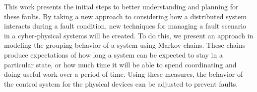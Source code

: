 This work presents the initial steps to better understanding and planning for these faults.
By taking a new approach to considering how a distributed system interacts during a fault condition,
new techniques for managing a fault scenario in a cyber-physical systems will be created. To do
this, we present an approach in modeling the grouping behavior of a system using Markov chains.
These chains produce expectations of how long a system can be expected to stay in a particular
state, or how much time it will be able to spend coordinating and doing useful work over a period
of time. Using these measures, the behavior of the control system for the physical devices
can be adjusted to prevent faults.
